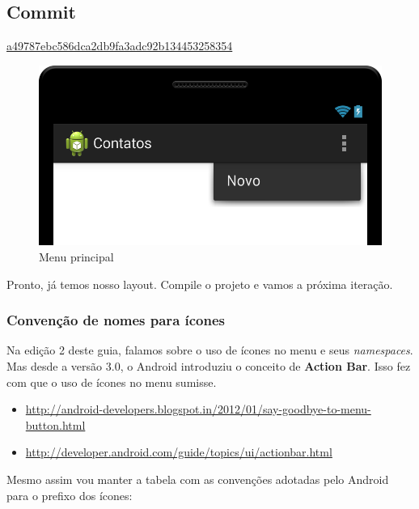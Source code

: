 \subsection{Commit}

\href{https://github.com/atilacamurca/guia-aberto-android-contatos/tree/a49787ebc586dca2db9fa3adc92b134453258354}{a49787ebc586dca2db9fa3adc92b134453258354}

\begin{figure}[h]
    \includegraphics[scale=0.3]{img/exemplo-pratico/main_menu-1.png}
    \caption{Menu principal}
\end{figure}

Pronto, já temos nosso layout. Compile o projeto e vamos a próxima
iteração.

\subsubsection{Convenção de nomes para ícones \label{sssec:nomeicones}}

Na edição 2 deste guia, falamos sobre o uso de ícones no menu e seus
\emph{namespaces}. Mas desde a versão 3.0, o Android introduziu o
conceito de \textbf{Action Bar}. Isso fez com que o uso de ícones no
menu sumisse.

\begin{itemize}
\item
  \url{http://android-developers.blogspot.in/2012/01/say-goodbye-to-menu-button.html}
\item
  \url{http://developer.android.com/guide/topics/ui/actionbar.html}
\end{itemize}
Mesmo assim vou manter a tabela com as convenções adotadas pelo Android
para o prefixo dos ícones:

